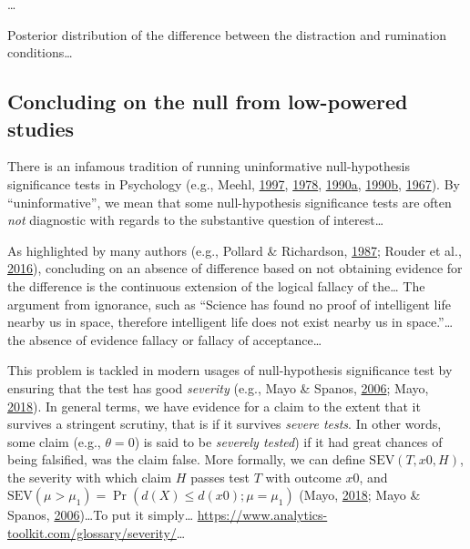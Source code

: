 \documentclass[
  english,
  man,floatsintext]{apa6}
\begin{document}
\ldots{}

Posterior distribution of the difference between the distraction and rumination conditions\ldots{}

\hypertarget{concluding-on-the-null-from-low-powered-studies}{%
\subsection{Concluding on the null from low-powered studies}\label{concluding-on-the-null-from-low-powered-studies}}

There is an infamous tradition of running uninformative null-hypothesis significance tests in Psychology (e.g., Meehl, \protect\hyperlink{ref-harlow_problem_1997}{1997}, \protect\hyperlink{ref-meehl_theoretical_1978}{1978}, \protect\hyperlink{ref-meehl_why_1990}{1990}\protect\hyperlink{ref-meehl_why_1990}{a}, \protect\hyperlink{ref-meehl_appraising_1990-1}{1990}\protect\hyperlink{ref-meehl_appraising_1990-1}{b}, \protect\hyperlink{ref-meehl_theory-testing_1967}{1967}). By ``uninformative'', we mean that some null-hypothesis significance tests are often \emph{not} diagnostic with regards to the substantive question of interest\ldots{}

As highlighted by many authors (e.g., Pollard \& Richardson, \protect\hyperlink{ref-pollard_probability_1987}{1987}; Rouder et al., \protect\hyperlink{ref-rouder_is_2016}{2016}), concluding on an absence of difference based on not obtaining evidence for the difference is the continuous extension of the logical fallacy of the\ldots{} The argument from ignorance, such as ``Science has found no proof of intelligent life nearby us in space, therefore intelligent life does not exist nearby us in space.''\ldots{} the absence of evidence fallacy or fallacy of acceptance\ldots{}

This problem is tackled in modern usages of null-hypothesis significance test by ensuring that the test has good \emph{severity} (e.g., Mayo \& Spanos, \protect\hyperlink{ref-mayo_severe_2006}{2006}; Mayo, \protect\hyperlink{ref-mayo_statistical_2018}{2018}). In general terms, we have evidence for a claim to the extent that it survives a stringent scrutiny, that is if it survives \emph{severe tests}. In other words, some claim (e.g., \(\theta = 0\)) is said to be \emph{severely tested}) if it had great chances of being falsified, was the claim false. More formally, we can define \(\text{SEV}(T, x0, H)\), the severity with which claim \(H\) passes test \(T\) with outcome \(x0\), and \(\text{SEV}(\mu > \mu_{1}) = \Pr(d(X) \leq d(x0); \mu = \mu_{1})\) (Mayo, \protect\hyperlink{ref-mayo_statistical_2018}{2018}; Mayo \& Spanos, \protect\hyperlink{ref-mayo_severe_2006}{2006})\ldots To put it simply\ldots{} \url{https://www.analytics-toolkit.com/glossary/severity/}\ldots{}
\end{document}
